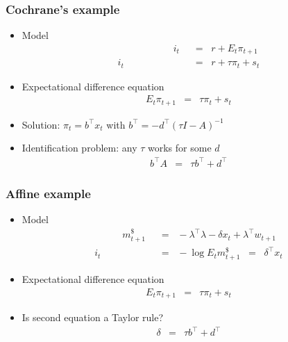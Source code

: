 \documentclass{beamer}
\begin{document}
\begin{frame}
\frametitle{Cochrane's example}
\begin{itemize} \itemsep = \bigskipamount
\item Model
\begin{align*}
    \phantom{xxxxxxxxxx}
    i_t &\;\;=\;\; r + E_t \pi_{t+1}  \tag{Fisher equation} \\
    i_t &\;\;=\;\; r + \tau \pi_{t} +  s_{t} \tag{Taylor rule}
\end{align*}
\item Expectational difference equation
\begin{eqnarray*}
    E_t \pi_{t+1} &=& \tau \pi_t + s_t
\end{eqnarray*}
\item Solution:  $\pi_t = b^\top x_t $ with
    $b^\top = - d^\top (\tau I - A)^{-1} $
\item Identification problem:  any $\tau$ works for some $d$
\begin{eqnarray*}
    b^\top A &=& \tau b^\top + d^\top
\end{eqnarray*}
\end{itemize}
\end{frame}

\begin{frame}
\frametitle{Affine example}
\begin{itemize} \itemsep = \bigskipamount
\item Model
\begin{align*}
    \phantom{xxxxx}
    m^\$_{t+1} &\;\;=\;\; -\lambda^\top \lambda - \delta x_t + \lambda^\top w_{t+1}
            \tag{Pricing kernel} \\
    i_t &\;\;=\;\; - \log E_t m^\$_{t+1} \;\;=\;\; \delta^\top x_t  \tag{Euler equation}
\end{align*}
\item Expectational difference equation
\begin{eqnarray*}
    E_t \pi_{t+1} &=& \tau \pi_t + s_t
\end{eqnarray*}
\item Is second equation a Taylor rule?
\begin{eqnarray*}
    \delta &=& \tau b^\top + d^\top
\end{eqnarray*}
\end{itemize}
\end{frame}
\end{document}
